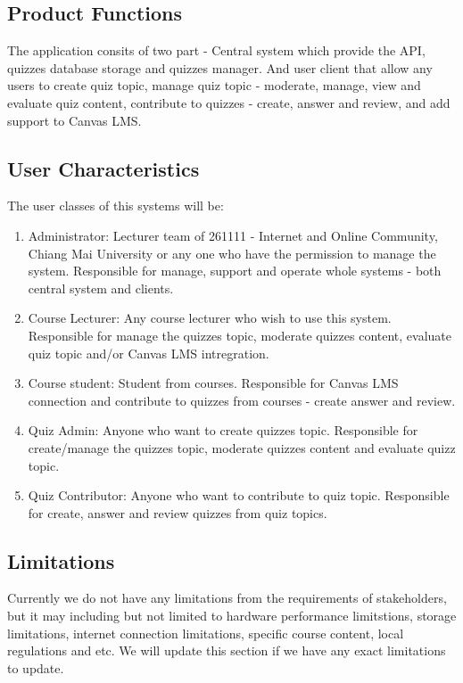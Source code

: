 \documentclass[ 10pt]{report}
\begin{document}
            \subsection{Product Functions}
            The application consits of two part - Central system which provide the API, quizzes database storage and quizzes manager. And user client that allow any users to create quiz topic, manage quiz topic - moderate, manage, view and evaluate quiz content, contribute to quizzes - create, answer and review, and add support to Canvas LMS.
            \subsection{User Characteristics}
            The user classes of this systems will be:
            \begin{enumerate}
                \item Administrator: Lecturer team of 261111 - Internet and Online Community, Chiang Mai University or any one who have the permission to manage the system. Responsible for manage, support and operate whole systems - both central system and clients.
                \item Course Lecturer: Any course lecturer who wish to use this system. Responsible for manage the quizzes topic, moderate quizzes content, evaluate quiz topic and/or Canvas LMS intregration.
                \item Course student: Student from courses. Responsible for Canvas LMS connection and contribute to quizzes from courses - create answer and review.  
                \item Quiz Admin: Anyone who want to create quizzes topic. Responsible for create/manage the quizzes topic, moderate quizzes content and evaluate quizz topic.
                \item Quiz Contributor: Anyone who want to contribute to quiz topic. Responsible for create, answer and review quizzes from quiz topics.
            \end{enumerate}
            \subsection{Limitations}
            Currently we do not have any limitations from the requirements of stakeholders, but it may including but not limited to hardware performance limitstions, storage limitations, internet connection limitations, specific course content, local regulations and etc. We will update this section if we have any exact limitations to update.
\end{document}
